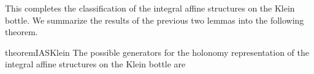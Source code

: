 This completes the classification of the integral affine structures on the Klein bottle. We summarize the results of the previous two lemmas into the following theorem.
\begin{restatable}{theorem}{IASKlein}\label{thm:IAS-Klein}
    The possible generators for the holonomy representation of the integral affine structures on the Klein bottle are
\end{restatable}
